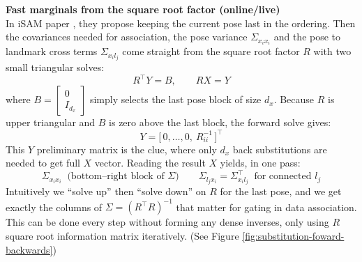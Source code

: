 \noindent
\textbf{Fast marginals from the square root factor (online/live)} 
\\ \noindent
In iSAM paper \cite{iSAM_paper}, they propose keeping the current pose last in the ordering. Then the covariances needed for association, the pose variance $\Sigma_{x_i x_i}$ and the pose to landmark cross terms $\Sigma_{x_i l_j}$ come straight from the square root factor $R$ with two small triangular solves:
$$
    R^\top Y = B,\qquad R X = Y
$$
where $B=\begin{bmatrix}0\\ I_{d_x}\end{bmatrix}$ simply selects the last pose block of size $d_x$. Because $R$ is upper triangular and $B$ is zero above the last block, the forward solve gives:
$$
Y=\big[\,0,\ldots,0,\ R_{ii}^{-1}\,\big]^\top
$$
This $Y$ preliminary matrix is the clue, where only $d_x$ back substitutions are needed to get full $X$ vector. Reading the result $X$ yields, in one pass:
$$
\Sigma_{x_i x_i} \;\; \text{(bottom–right block of } \Sigma)\qquad
\Sigma_{l_j x_i}=\Sigma_{x_i l_j}^\top \;\; \text{for connected } l_j
$$
Intuitively we ``solve up'' then ``solve down'' on $R$ for the last pose, and we get exactly the columns of $\Sigma=(R^\top R)^{-1}$ that matter for gating in data association. This can be done every step without forming any dense inverses, only using $R$ square root information matrix iteratively. (See Figure \ref{fig:substitution-foward-backwards})
